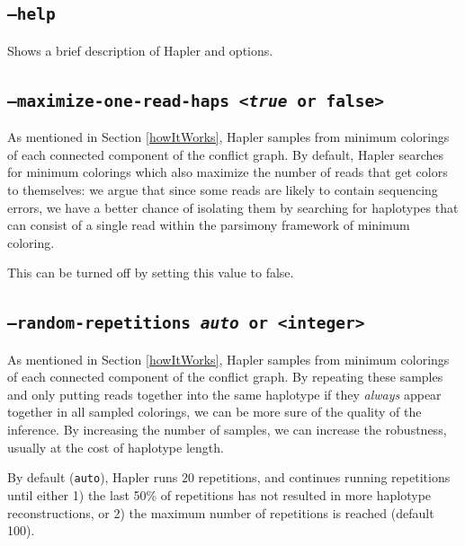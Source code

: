 \documentclass[11pt]{llncs}
\begin{document}

\subsection{\texttt{--help}}

Shows a brief description of Hapler and options.


\subsection{\texttt{--maximize-one-read-haps <\emph{true} or false>}}

As mentioned in Section \ref{howItWorks}, Hapler samples from minimum colorings of each connected component of the conflict graph.
By default, Hapler searches for minimum colorings which also maximize the number of reads that get colors to themselves: we argue that
since some reads are likely to contain sequencing errors, we have a better chance of isolating them by searching for haplotypes that can 
consist of a single read within the parsimony framework of minimum coloring.

This can be turned off by setting this value to false.

\subsection{\texttt{--random-repetitions \emph{auto} or <integer>}}

As mentioned in Section \ref{howItWorks}, Hapler samples from minimum colorings of each connected component of the conflict graph.
By repeating these samples and only putting reads together into the same haplotype if they \emph{always} appear together in all
sampled colorings, we can be more sure of the quality of the inference. By increasing the number of samples, we can increase the robustness,
usually at the cost of haplotype length.

By default (\texttt{auto}), Hapler runs 20 repetitions, and continues running repetitions until either 1) the last 50\% of repetitions has not resulted
in more haplotype reconstructions, or 2) the maximum number of repetitions is reached (default 100).
\end{document}
